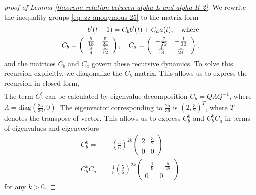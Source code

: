 \documentclass[journal=jctcce,a4paper,manuscript=article]{achemso}
\begin{document}
\begin{proof}[proof of Lemma \ref{theorem: relation between alpha L and alpha R 2}]
  We rewrite the inequality groups \eqref{eq: zz anonymous 25} to the matrix form
  \begin{align}
    b'(t+1)=C_b b'(t)+C_a a(t), \quad \text{where} \\
    C_b=\left(\begin{array}{c c}
                  \frac{5}{18} & \frac{5}{24} \\
                  \frac{5}{9}  & \frac{5}{12}
                \end{array}\right), \quad C_a=\left(\begin{array}{cc}
                                                      -\frac{7}{72} & -\frac{1}{12} \\
                                                      \frac{1}{18}  & \frac{1}{24}
                                                    \end{array}\right),
  \end{align}
  and the matrices $C_b$ and $C_a$ govern these recursive dynamics. To solve this recursion explicitly, we diagonalize the $C_b$ matrix. This allows us to express the recursion in closed form,
  \begin{align}
  \end{align}
  The term $C_b^t$ can be calculated by eigenvalue decomposition $C_b=Q \Lambda Q^{-1}$, where $\Lambda=\text{diag}(\frac{25}{36},0)$. The eigenvector corresponding to $\frac{25}{36}$ is $(2, \frac{3}{2})^T$, where $T$ denotes the transpose of vector. This allows us to express $C_b^k$ and $C_b^kC_a$ in terms of eigenvalues and eigenvectors
  \begin{align}
    C_b^k=     & \left(\frac{5}{6}\right)^{2k}\begin{pmatrix}
                                                2 & \frac{3}{2} \\
                                                0 & 0
                                              \end{pmatrix}                         \\
    C_b^kC_a = & \frac{1}{5}\left(\frac{5}{6}\right)^{2k}\begin{pmatrix}
                                                           -\frac{1}{9} & -\frac{5}{48} \\
                                                           0            & 0
                                                         \end{pmatrix}
  \end{align}
  for any $k>0$.


\end{proof}
\end{document}
